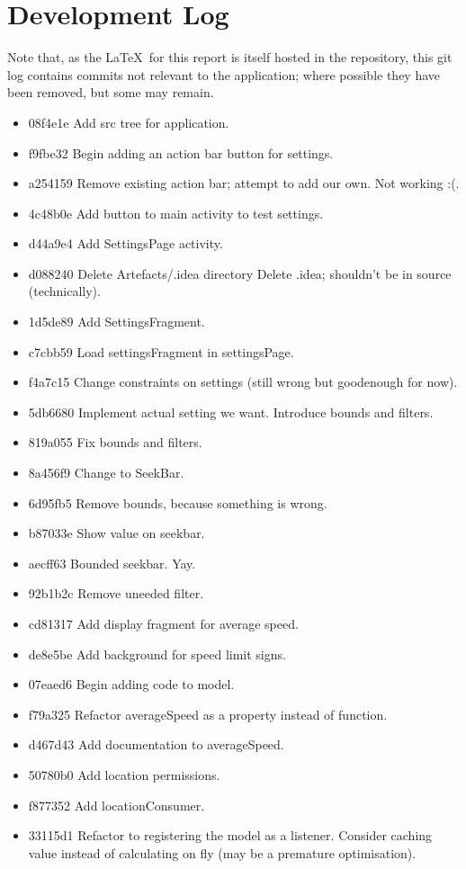 \documentclass[11pt, a4paper, notitlepage]{report}
\begin{document}
\appendix
\chapter{Development Log}\label{app:GitLog}
Note that, as the \LaTeX\ for this report is itself hosted in the repository, this git log contains commits not relevant to the application; where possible they have been removed, but some may remain. 

\begin{itemize}
	\item 08f4e1e Add src tree for application. 
	\item f9fbe32 Begin adding an action bar button for settings. 
	\item a254159 Remove existing action bar; attempt to add our own. Not working :(. 
	\item 4c48b0e Add button to main activity to test settings. 
	\item d44a9e4 Add SettingsPage activity. 
	\item d088240 Delete Artefacts/.idea directory Delete .idea; shouldn't be in source (technically).
	\item 1d5de89 Add SettingsFragment. 
	\item c7cbb59 Load settingsFragment in settingsPage. 
	\item f4a7c15 Change constraints on settings (still wrong but goodenough for now). 
	\item 5db6680 Implement actual setting we want. Introduce bounds and filters. 
	\item 819a055 Fix bounds and filters. 
	\item 8a456f9 Change to SeekBar. 
	\item 6d95fb5 Remove bounds, because something is wrong. 
	\item b87033e Show value on seekbar. 
	\item aecff63 Bounded seekbar. Yay. 
	\item 92b1b2c Remove uneeded filter. 
	\item cd81317 Add display fragment for average speed. 
	\item de8e5be Add background for speed limit signs. 
	\item 07eaed6 Begin adding code to model. 
	\item f79a325 Refactor averageSpeed as a property instead of function. 
	\item d467d43 Add documentation to averageSpeed. 
	\item 50780b0 Add location permissions. 
	\item f877352 Add locationConsumer. 
	\item 33115d1 Refactor to registering the model as a listener. Consider caching value instead of calculating on fly (may be a premature optimisation).
	

\end{itemize}
\end{document}
